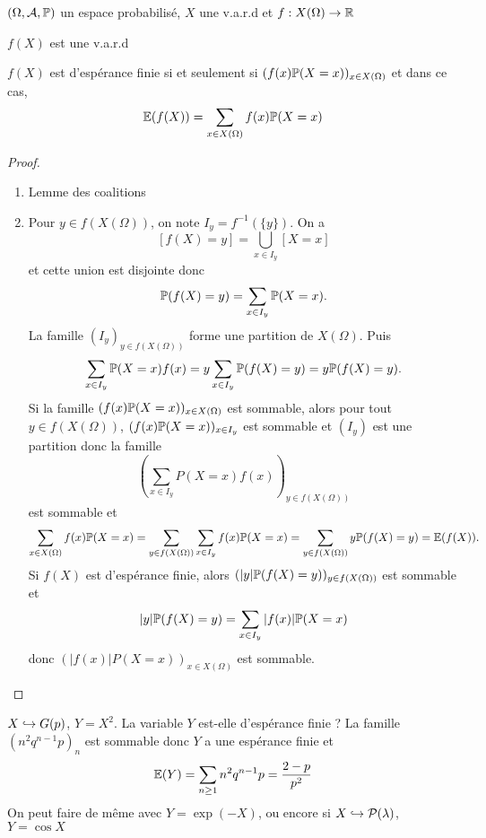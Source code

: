 \begin{thm}
    \Hyp $(\Omega, \mathcal  A, \P)$ un espace probabilisé, $X$ une v.a.r.d et  $f:X(\Omega)\to \R$
    \begin{concenum}
    \item $f(X)$ est une v.a.r.d
    \item  $f(X)$ est d'espérance finie  si et seulement si $(f(x)\P(X=x))_{x\in X(\Omega)}$ et dans ce cas, \[
            \E(f(X))=\sum_{x\in X(\Omega)}f(x)\P(X=x)
    \] 
    \end{concenum}
\end{thm}

\begin{proof}~
    \begin{enumerate}
        \item Lemme des coalitions
        \item Pour $y\in f(X(\Omega))$, on note $I_y=f^{-1}(\{y\} )$. On a \[
                [f(X)=y]=\bigcup_{x\in I_y}[X=x] 
        \] 
        et cette union est disjointe donc \[
            \P(f(X)=y)=\sum_{x\in I_y}\P(X=x).
        \]
        La famille $(I_y)_{y\in f(X(\Omega))}$ forme une partition de $X(\Omega)$. Puis  \[
            \sum_{x \in  I_y}\P(X=x)f(x)=y\sum_{x\in I_y}\P(f(X)=y)=y\P(f(X)=y).
        \] Si la famille $(f(x)\P(X=x))_{x \in  X(\Omega)}$ est sommable, alors pour tout $y\in f(X(\Omega))$, $(f(x)\P(X=x))_{x\in I_y}$ est sommable et $(I_y)$ est une partition donc la famille  \[
        \left( \sum_{x \in  I_y} P(X=x)f(x)\right) _{y\in f(X(\Omega))}
        \] 
        est sommable et \[
            \sum_{x\in X(\Omega)}f(x)\P(X=x)=\sum_{y\in f(X(\Omega))}\sum_{x \in  I_y}f(x)\P(X=x)=\sum_{y\in f(X(\Omega))}y\P(f(X)=y)=\E(f(X)).
        \] 
        Si $f(X)$ est d'espérance finie, alors $(|y|\P(f(X)=y))_{y\in  f(X(\Omega))}$ est sommable et \[
            |y|\P(f(X)=y)=\sum_{x \in  I_y}|f(x)|\P(X=x)
        \] 
        donc $(|f(x)|P(X=x))_{x\in X(\Omega)}$ est sommable.
    \end{enumerate}
\end{proof}

\begin{ex}
    $X\suit G(p)$, $Y=X^2$. La variable $Y$ est-elle d'espérance finie ? La famille $(n^2q^{n-1}p)_n$ est sommable donc $Y$ a une espérance finie et \[
        \E(Y)=\sum_{n\geq 1}n^2q^{n-1}p=\frac{2-p}{p^2}
    \] 
    On peut faire de même avec $Y=\exp (-X)$, ou encore si $X\suit \mathcal  P(\lambda)$, $Y=\cos  X$
\end{ex}

